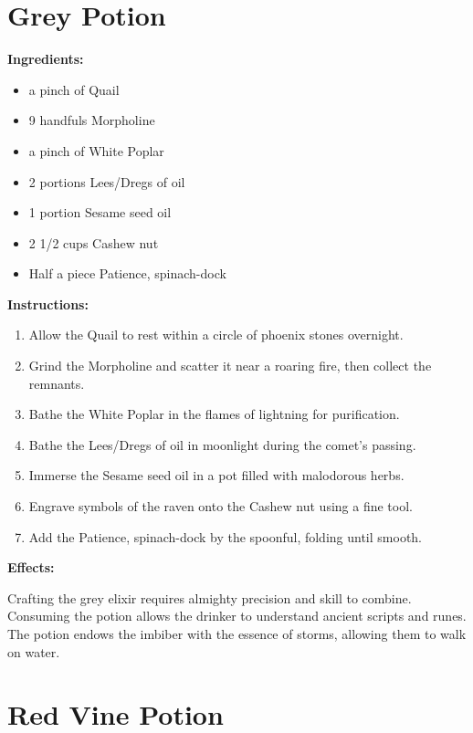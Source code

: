\documentclass{article}
\begin{document}
\newpage
\section*{Grey Potion}

\textbf{Ingredients:}

\begin{itemize}
  \item a pinch of Quail
  \item 9 handfuls Morpholine
  \item a pinch of White Poplar
  \item 2 portions Lees/Dregs of oil
  \item 1 portion Sesame seed oil
  \item 2 1/2 cups Cashew nut
  \item Half a piece Patience, spinach-dock
\end{itemize}

\textbf{Instructions:}

\begin{enumerate}
  \item Allow the Quail to rest within a circle of phoenix stones overnight.
  \item Grind the Morpholine and scatter it near a roaring fire, then collect the remnants.
  \item Bathe the White Poplar in the flames of lightning for purification.
  \item Bathe the Lees/Dregs of oil in moonlight during the comet’s passing.
  \item Immerse the Sesame seed oil in a pot filled with malodorous herbs.
  \item Engrave symbols of the raven onto the Cashew nut using a fine tool.
  \item Add the Patience, spinach-dock by the spoonful, folding until smooth.
\end{enumerate}

\textbf{Effects:}

Crafting the grey elixir requires almighty precision and skill to combine. Consuming the potion allows the drinker to understand ancient scripts and runes. The potion endows the imbiber with the essence of storms, allowing them to walk on water.

\newpage
\section*{Red Vine Potion}
\end{document}
